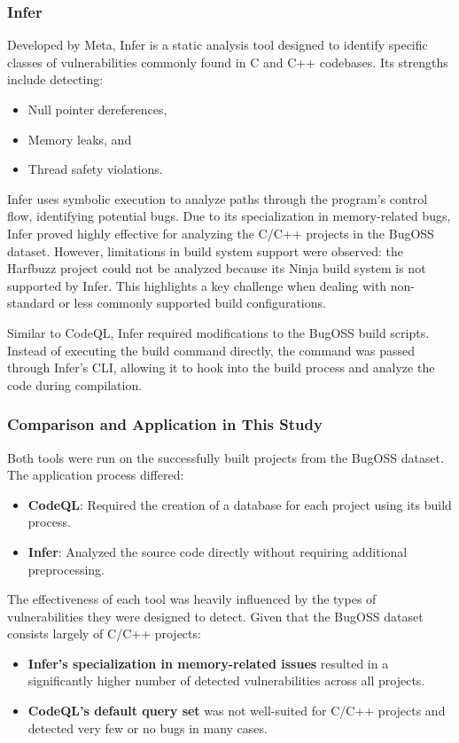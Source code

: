 \subsubsection{Infer}
Developed by Meta, Infer is a static analysis tool designed to identify specific classes of vulnerabilities commonly found in C and C++ codebases. Its strengths include detecting:
\begin{itemize}
    \item Null pointer dereferences,
    \item Memory leaks, and
    \item Thread safety violations.
\end{itemize}

Infer uses symbolic execution to analyze paths through the program's control flow, identifying potential bugs. Due to its specialization in memory-related bugs, Infer proved highly effective for analyzing the C/C++ projects in the BugOSS dataset. However, limitations in build system support were observed: the Harfbuzz project could not be analyzed because its Ninja build system is not supported by Infer. This highlights a key challenge when dealing with non-standard or less commonly supported build configurations.

Similar to CodeQL, Infer required modifications to the BugOSS build scripts. Instead of executing the build command directly, the command was passed through Infer's CLI, allowing it to hook into the build process and analyze the code during compilation.

\subsubsection{Comparison and Application in This Study}
Both tools were run on the successfully built projects from the BugOSS dataset. The application process differed:
\begin{itemize}
    \item \textbf{CodeQL}: Required the creation of a database for each project using its build process.
    \item \textbf{Infer}: Analyzed the source code directly without requiring additional preprocessing.
\end{itemize}

The effectiveness of each tool was heavily influenced by the types of vulnerabilities they were designed to detect. Given that the BugOSS dataset consists largely of C/C++ projects:
\begin{itemize}
    \item \textbf{Infer's specialization in memory-related issues} resulted in a significantly higher number of detected vulnerabilities across all projects.
    \item \textbf{CodeQL's default query set} was not well-suited for C/C++ projects and detected very few or no bugs in many cases.
\end{itemize}

